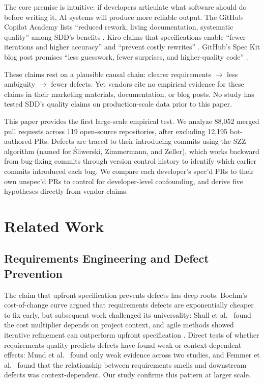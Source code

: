 \documentclass[a4paper,UKenglish,cleveref,autoref,thm-restate]{lipics-v2021}
\begin{document}
The core premise is intuitive: if developers articulate what software should do before writing it, AI systems will produce more reliable output. The GitHub Copilot Academy lists ``reduced rework, living documentation, systematic quality'' among SDD's benefits \cite{copilotacademy2025}. Kiro claims that specifications enable ``fewer iterations and higher accuracy'' and ``prevent costly rewrites'' \cite{kiro2025b}. GitHub's Spec Kit blog post promises ``less guesswork, fewer surprises, and higher-quality code'' \cite{speckit2025}.

These claims rest on a plausible causal chain: clearer requirements $\rightarrow$ less ambiguity $\rightarrow$ fewer defects. Yet vendors cite no empirical evidence for these claims in their marketing materials, documentation, or blog posts. No study has tested SDD's quality claims on production-scale data prior to this paper.

This paper provides the first large-scale empirical test. We analyze 88,052 merged pull requests across 119 open-source repositories, after excluding 12,195 bot-authored PRs. Defects are traced to their introducing commits using the SZZ algorithm (named for \'Sliwerski, Zimmermann, and Zeller), which works backward from bug-fixing commits through version control history to identify which earlier commits introduced each bug. We compare each developer's spec'd PRs to their own unspec'd PRs to control for developer-level confounding, and derive five hypotheses directly from vendor claims.

\section{Related Work}

\subsection{Requirements Engineering and Defect Prevention}

The claim that upfront specification prevents defects has deep roots. Boehm's cost-of-change curve \cite{boehm1981} argued that requirements defects are exponentially cheaper to fix early, but subsequent work challenged its universality: Shull et al.\ \cite{shull2002} found the cost multiplier depends on project context, and agile methods showed iterative refinement can outperform upfront specification \cite{beck2001}. Direct tests of whether requirements quality predicts defects have found weak or context-dependent effects: Mund et al.\ \cite{mund2015} found only weak evidence across two studies, and Femmer et al.\ \cite{femmer2017} found that the relationship between requirements smells and downstream defects was context-dependent. Our study confirms this pattern at larger scale.
\end{document}
